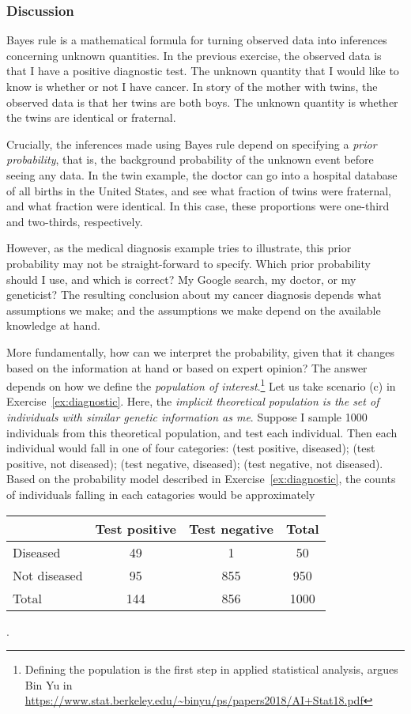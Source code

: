 \documentclass[11pt]{article}
\theoremstyle{definition}
\begin{document}
\subsubsection*{Discussion}

Bayes rule is a mathematical formula for turning observed data into
inferences concerning unknown quantities.
In the previous exercise, the observed data is that I have a positive diagnostic test.
The unknown quantity that I would like to know is whether or not I have cancer.
In story of the mother with twins, the observed data is that her
twins are both boys. The unknown quantity is whether the twins are identical or fraternal.

Crucially, the inferences made using Bayes rule depend on specifying a \textit{prior probability},
that is, the background probability of the unknown event before seeing any data.
In the twin example, the doctor can go into a hospital database of all births in the United States,
and see what fraction of twins were fraternal, and what fraction were identical.
In this case, these proportions were one-third and two-thirds, respectively.

However, as the medical diagnosis example tries to illustrate, this prior probability
may not be straight-forward to specify. Which prior probability should I use, and which is correct? My Google search, my doctor,
or my geneticist? The resulting conclusion about my cancer diagnosis
depends what assumptions we make; and the assumptions we make depend
on the available knowledge at hand.

More fundamentally, how can we interpret the
probability, given that it changes based on the
information at hand or based on expert opinion?
The answer depends on how we define the \textit{population
of interest}.\footnote{
Defining the population is the
first step in applied statistical analysis,
argues Bin Yu in
\url{https://www.stat.berkeley.edu/~binyu/ps/papers2018/AI+Stat18.pdf}
}
Let us take scenario (c) in Exercise~\ref{ex:diagnostic}.
Here, the \textit{implicit theoretical population is the set of
individuals with similar genetic information as me}.
Suppose I sample 1000 individuals from this theoretical
population, and test each individual.
Then each individual would fall in one of four categories:
(test positive, diseased); (test positive, not diseased);
(test negative, diseased); (test negative, not diseased).
Based on the probability model described in
Exercise~\ref{ex:diagnostic}, the counts
of individuals falling in each catagories would be
approximately
\begin{table}[!h]
  \centering
  \begin{tabular}{l|cc|c}
    & Test positive & Test negative & Total \\\hline
  Diseased & 49 & 1 & 50 \\
  Not diseased & 95 & 855 & 950\\ \hline
  Total & 144 & 856 & 1000
  \end{tabular}
\end{table}.
\end{document}
